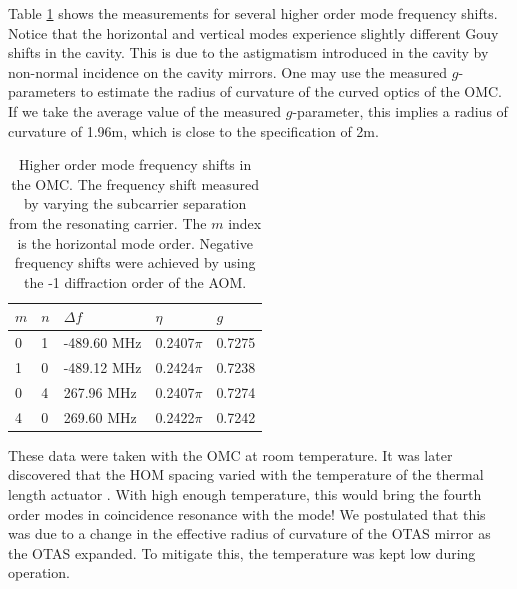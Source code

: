 Table \ref{tab:HOM} shows the measurements for several higher order mode frequency shifts. %
Notice that the horizontal and vertical modes experience slightly different Gouy shifts in the cavity. %
This is due to the astigmatism introduced in the cavity by non-normal incidence on the cavity mirrors. %
One may use the measured $g$-parameters to estimate the radius of curvature of the curved optics of the OMC. %
If we take the average value of the measured $g$-parameter, this implies a radius of curvature of 1.96m, which is close to the specification of 2m.

\begin{table}
  \begin{center}
    \begin{tabular}{lll|ll}
      \hline
      $m$ & $n$ & $\Delta f$ & $\eta$ & $g$ \\
      \hline
      0 & 1 & -489.60 MHz & 0.2407$\pi$ & 0.7275\\
      1 & 0 & -489.12 MHz & 0.2424$\pi$ & 0.7238\\
      0 & 4 &  267.96 MHz & 0.2407$\pi$ & 0.7274\\
      4 & 0 &  269.60 MHz & 0.2422$\pi$ & 0.7242\\
      \hline
    \end{tabular}
  \caption[Higher order mode frequency shifts in the OMC]{Higher order mode frequency shifts in the OMC. The frequency shift measured by varying the subcarrier separation from the resonating carrier. The $m$ index is the horizontal mode order. Negative frequency shifts were achieved by using the -1 diffraction order of the AOM.}
  \label{tab:HOM}
  \end{center}
\end{table}

These data were taken with the OMC at room temperature. %
It was later discovered that the HOM spacing varied with the temperature of the thermal length actuator \cite{OTASmodes}. %
With high enough temperature, this would bring the fourth order modes in coincidence resonance with the  mode! %
We postulated that this was due to a change in the effective radius of curvature of the OTAS mirror as the OTAS expanded. %
To mitigate this, the temperature was kept low during operation.

